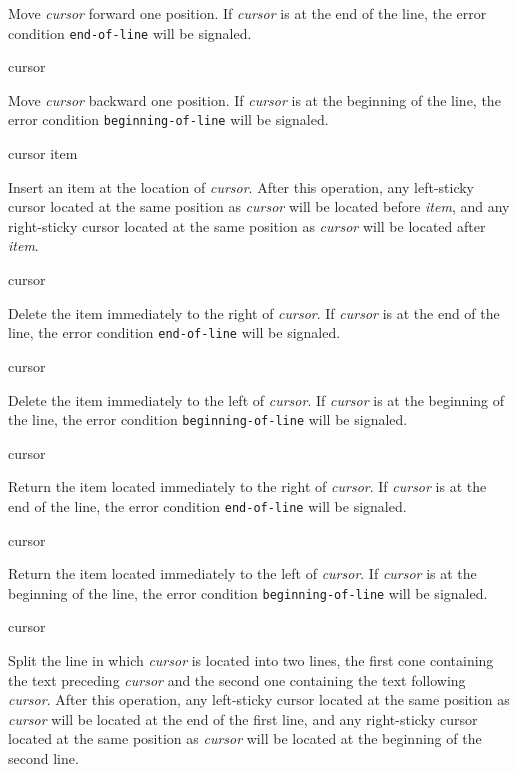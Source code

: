 Move \textit{cursor} forward one position.  If \emph{cursor} is at the
end of the line, the error condition \texttt{end-of-line} will be
signaled.

 {cursor}

Move \textit{cursor} backward one position.  If \emph{cursor} is at
the beginning of the line, the error condition
\texttt{beginning-of-line} will be signaled.

 {cursor item}

Insert an item at the location of \textit{cursor}.  After this
operation, any left-sticky cursor located at the same position as
\textit{cursor} will be located before \textit{item}, and any
right-sticky cursor located at the same position as \textit{cursor}
will be located after \textit{item}.

 {cursor}

Delete the item immediately to the right of \emph{cursor}.  If
\emph{cursor} is at the end of the line, the error condition
\texttt{end-of-line} will be signaled.

 {cursor}

Delete the item immediately to the left of \emph{cursor}.  If
\emph{cursor} is at the beginning of the line, the error condition
\texttt{beginning-of-line} will be signaled.

 {cursor}

Return the item located immediately to the right of \textit{cursor}.
If \emph{cursor} is at the end of the line, the error condition
\texttt{end-of-line} will be signaled.

 {cursor}

Return the item located immediately to the left of \textit{cursor}.
If \emph{cursor} is at the beginning of the line, the error condition
\texttt{beginning-of-line} will be signaled.

 {cursor}

Split the line in which \textit{cursor} is located into two lines, the
first cone containing the text preceding \textit{cursor} and the
second one containing the text following \textit{cursor}.  After this
operation, any left-sticky cursor located at the same position as
\textit{cursor} will be located at the end of the first line, and any
right-sticky cursor located at the same position as \textit{cursor}
will be located at the beginning of the second line.

